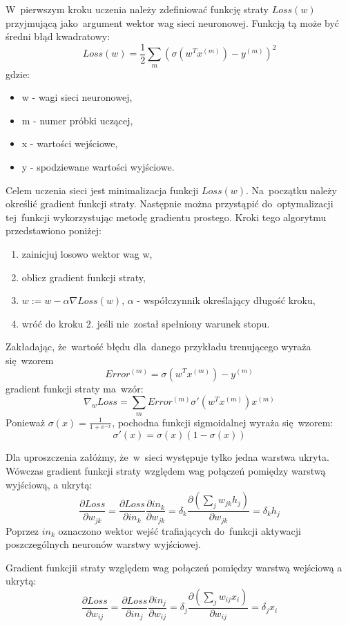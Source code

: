 W~pierwszym kroku uczenia należy zdefiniować funkcję straty $Loss(w)$ przyjmującą jako~argument wektor wag
sieci neuronowej. Funkcją tą może być średni błąd kwadratowy:\\
$$Loss(w)=\frac{1}{2}\sum\limits_{m}(\sigma(w^{T}x^{(m)}) - y^{(m)})^2$$ gdzie:
\begin{itemize}
  \item w - wagi sieci neuronowej,
  \item m - numer próbki uczącej,
  \item x - wartości wejściowe,
  \item y - spodziewane wartości wyjściowe.
\end{itemize}

Celem uczenia sieci jest minimalizacja funkcji $Loss(w)$. Na~początku należy określić gradient funkcji straty.
Następnie można przystąpić do~optymalizacji tej~funkcji wykorzystując metodę
gradientu prostego. Kroki tego algorytmu przedstawiono poniżej:
\begin{enumerate}
  \item zainicjuj losowo wektor wag w,
  \item oblicz gradient funkcji straty,
  \item $w:=w-\alpha \nabla Loss(w)$, $\alpha$ - współczynnik określający długość kroku,
  \item wróć do kroku 2. jeśli nie~został spełniony warunek stopu.
\end{enumerate}

Zakładając, że~wartość błędu dla~danego przykładu trenującego wyraża się~wzorem
$$Error^{(m)}=\sigma(w^{T}x^{(m)})-y^{(m)}$$
gradient funkcji straty ma~wzór:
$$\nabla_{w}Loss=\sum\limits_{m}Error^{(m)}\sigma'(w^{T}x^{(m)})x^{(m)}$$
Ponieważ $\sigma(x)=\frac{1}{1+e^{-x}}$, pochodna funkcji sigmoidalnej wyraża się~wzorem:
$$\sigma'(x)=\sigma(x)(1-\sigma(x))$$

Dla uproszczenia załóżmy, że~w~sieci występuje tylko jedna warstwa ukryta. Wówczas gradient funkcji straty
względem wag połączeń pomiędzy warstwą wyjściową, a ukrytą:
$$\frac{\partial Loss}{\partial w_{jk}}=\frac{\partial Loss}{\partial in_k}\frac{\partial
in_k}{\partial w_{jk}}= \delta_k \frac{\partial (\sum\limits_j w_{jk}h_j)}{\partial w_{jk}} = \delta_k h_j$$
Poprzez $in_k$ oznaczono wektor wejść trafiających do~funkcji aktywacji poszczególnych neuronów warstwy
wyjściowej.

Gradient funkcjii straty względem wag połączeń pomiędzy warstwą wejściową a ukrytą: 
$$ \frac{\partial Loss}{\partial w_{ij}}=\frac{\partial Loss}{\partial in_j}\frac{\partial in_j}{\partial
w_{ij}} = \delta_j \frac{\partial (\sum\limits_j w_{ij}x_i)}{\partial w_{ij}} = \delta_j x_i $$

